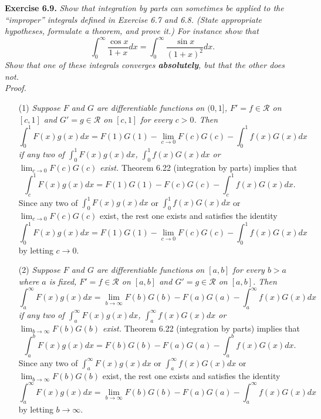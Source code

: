 \documentclass{article}
\begin{document}



\textbf{Exercise 6.9.}
\emph{Show that integration by parts can sometimes be applied to the
``improper'' integrals defined in Exercise 6.7 and 6.8.
(State appropriate hypotheses, formulate a theorem, and prove it.)
For instance show that
\[
  \int_{0}^{\infty} \frac{\cos x}{1+x} dx
  = \int_{0}^{\infty} \frac{\sin x}{(1+x)^2} dx.
\]
Show that one of these integrals converges \textbf{absolutely}, but that
the other does not.} \\



\emph{Proof.}
\begin{enumerate}
\item[(1)]
\emph{Suppose $F$ and $G$ are differentiable functions on $(0,1]$,
$F' = f \in \mathscr{R}$ on $[c,1]$ and $G' = g \in \mathscr{R}$ on $[c,1]$
for every $c > 0$.
Then
\[
  \int_{0}^{1} F(x)g(x) dx
  = F(1)G(1) - \lim_{c \to 0} F(c)G(c)
  - \int_{0}^{1} f(x)G(x) dx
\]
if any two of $\int_{0}^{1} F(x)g(x) dx$, $\int_{0}^{1} f(x)G(x) dx$
or $\lim_{c \to 0} F(c)G(c)$ exist.}
Theorem 6.22 (integration by parts) implies that
\[
  \int_{c}^{1} F(x)g(x) dx
  = F(1)G(1) - F(c)G(c)
  - \int_{c}^{1} f(x)G(x) dx.
\]
Since any two of $\int_{0}^{1} F(x)g(x) dx$ or $\int_{0}^{1} f(x)G(x) dx$
or $\lim_{c \to 0} F(c)G(c)$ exist,
the rest one exists and satisfies the identity
\[
  \int_{0}^{1} F(x)g(x) dx
  = F(1)G(1) - \lim_{c \to 0} F(c)G(c)
  - \int_{0}^{1} f(x)G(x) dx
\]
by letting $c \to 0$.

\item[(2)]
\emph{Suppose $F$ and $G$ are differentiable functions on $[a,b]$
for every $b > a$ where $a$ is fixed,
$F' = f \in \mathscr{R}$ on $[a,b]$ and $G' = g \in \mathscr{R}$ on $[a,b]$.
Then
\[
  \int_{a}^{\infty} F(x)g(x) dx
  = \lim_{b \to \infty}F(b)G(b) - F(a)G(a)
  - \int_{a}^{\infty} f(x)G(x) dx
\]
if any two of $\int_{a}^{\infty} F(x)g(x) dx$, $\int_{a}^{\infty} f(x)G(x) dx$
or $\lim_{b \to \infty}F(b)G(b)$ exist.}
Theorem 6.22 (integration by parts) implies that
\[
  \int_{a}^{b} F(x)g(x) dx
  = F(b)G(b) - F(a)G(a)
  - \int_{a}^{b} f(x)G(x) dx.
\]
Since any two of $\int_{a}^{\infty} F(x)g(x) dx$ or $\int_{a}^{\infty} f(x)G(x) dx$
or $\lim_{b \to \infty}F(b)G(b)$ exist,
the rest one exists and satisfies the identity
\[
  \int_{a}^{\infty} F(x)g(x) dx
  = \lim_{b \to \infty}F(b)G(b) - F(a)G(a)
  - \int_{a}^{\infty} f(x)G(x) dx
\]
by letting $b \to \infty$.


\end{enumerate}
\end{document}
